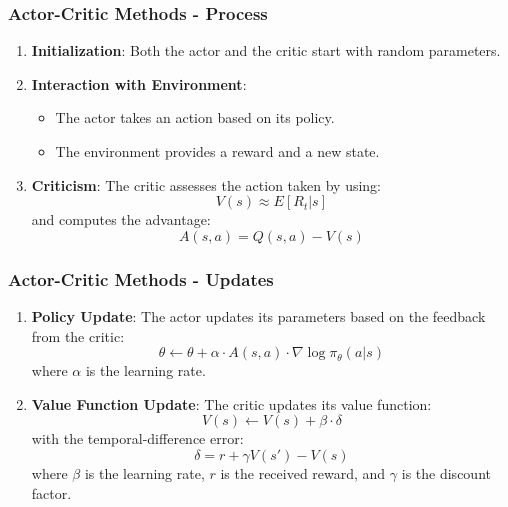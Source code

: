 \documentclass[aspectratio=169]{beamer}
\begin{document}
\begin{frame}[fragile]
    \frametitle{Actor-Critic Methods - Process}
    \begin{enumerate}
        \item \textbf{Initialization}: 
            Both the actor and the critic start with random parameters.
        \item \textbf{Interaction with Environment}:
            \begin{itemize}
                \item The actor takes an action based on its policy.
                \item The environment provides a reward and a new state.
            \end{itemize}
        \item \textbf{Criticism}:
            The critic assesses the action taken by using:
            \begin{equation}
                V(s) \approx E[R_t | s]
            \end{equation}
            and computes the advantage:
            \begin{equation}
                A(s, a) = Q(s, a) - V(s)
            \end{equation}
    \end{enumerate}
\end{frame}

\begin{frame}[fragile]
    \frametitle{Actor-Critic Methods - Updates}
    \begin{enumerate}[resume]
        \item \textbf{Policy Update}: 
            The actor updates its parameters based on the feedback from the critic:
            \begin{equation}
                \theta \leftarrow \theta + \alpha \cdot A(s, a) \cdot \nabla \log \pi_\theta(a | s)
            \end{equation}
            where \( \alpha \) is the learning rate.
        \item \textbf{Value Function Update}:
            The critic updates its value function:
            \begin{equation}
                V(s) \leftarrow V(s) + \beta \cdot \delta
            \end{equation}
            with the temporal-difference error:
            \begin{equation}
                \delta = r + \gamma V(s') - V(s)
            \end{equation}
            where \( \beta \) is the learning rate, \( r \) is the received reward, and \( \gamma \) is the discount factor.
    \end{enumerate}
\end{frame}
\end{document}
